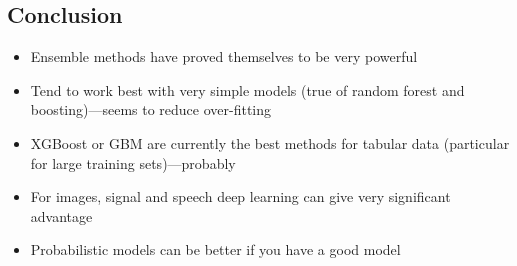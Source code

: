 
\begin{slide}
\section{Conclusion}

\begin{PauseHighLight}
  \begin{itemize}
  \item Ensemble methods have proved themselves to be very
    powerful\pause
  \item Tend to work best with very simple models (true of random forest
    and boosting)\pause---seems to reduce over-fitting\pauseb
  \item XGBoost or GBM are currently the best methods for tabular data
    (particular for large training sets)\pause---probably\pauseb
  \item For images, signal and speech deep learning can give very
    significant advantage\pause
  \item Probabilistic models can be better if you have a good model\pause
  \end{itemize}
\end{PauseHighLight}

\end{slide}


